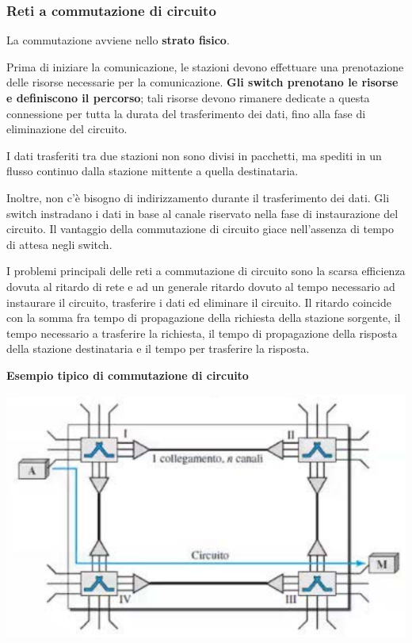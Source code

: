         \subsubsection{Reti a commutazione di circuito}
                    
            La commutazione avviene nello \textbf{strato fisico}.
                
            Prima di iniziare la comunicazione, le stazioni devono effettuare una prenotazione delle risorse necessarie per la comunicazione. \textbf{Gli switch prenotano le risorse e definiscono il percorso}; tali risorse devono rimanere dedicate a questa connessione per tutta la durata del trasferimento dei dati, fino alla fase di eliminazione del circuito.
                
            \vspace{3mm}    
            
            I dati trasferiti tra due stazioni non sono divisi in pacchetti, ma spediti in un flusso continuo dalla stazione mittente a quella destinataria.
                
            Inoltre, non c'è bisogno di indirizzamento durante il trasferimento dei dati. Gli switch instradano i dati in base al canale riservato nella fase di instaurazione del circuito. Il vantaggio della commutazione di circuito giace nell'assenza di tempo di attesa negli switch.

            \vspace{3mm}
            
            I problemi principali delle reti a commutazione di circuito sono la scarsa efficienza dovuta al ritardo di rete e ad un generale ritardo dovuto al tempo necessario ad instaurare il circuito, trasferire i dati ed eliminare il circuito. Il ritardo coincide con la somma fra tempo di propagazione della richiesta della stazione sorgente, il tempo necessario a trasferire la richiesta, il tempo di propagazione della risposta della stazione destinataria e il tempo per trasferire la risposta.

            \vspace{3mm}

            \textbf{Esempio tipico di commutazione di circuito}
                
            \begin{center}
                \includegraphics[scale=0.75]{images/Circuito_Fase1.png}
            \end{center}
                
